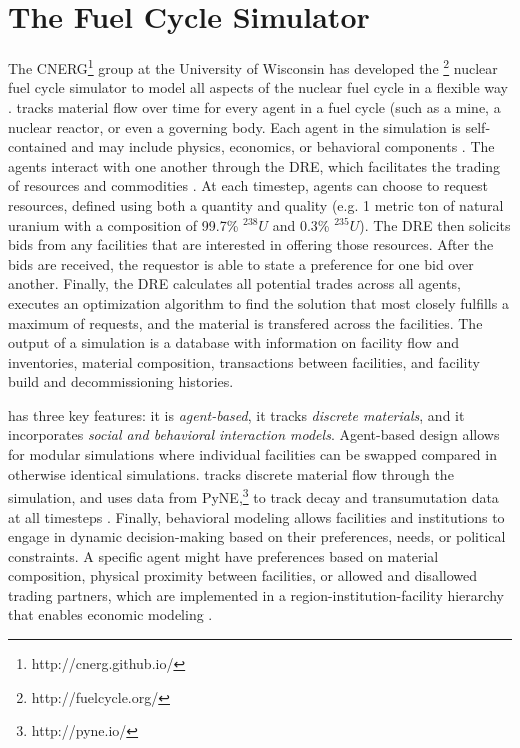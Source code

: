 \section{The \Cyclus Fuel Cycle Simulator}
\label{s_methods}

The \gls{CNERG}\footnote{http://cnerg.github.io/} group at the University of Wisconsin has developed the \Cyclus\footnote{http://fuelcycle.org/} nuclear fuel cycle simulator to model all aspects of the nuclear fuel cycle in a flexible way \cite{cyclus_v1_3}. \Cyclus tracks material flow over time for every agent in a fuel cycle (such as a mine, a nuclear reactor, or even a governing body.  Each agent in the simulation is self-contained and may include physics, economics, or behavioral components \cite{huff_open_2011,huff_fundamental_2016,gidden_agent-based_2013}.  The agents interact with one another through the \gls{DRE}, which facilitates the trading of resources and commodities \cite{gidden_agent-based_2014}.  At each timestep, agents can choose to request resources, defined using both a quantity and quality (e.g. 1 metric ton of natural uranium with a composition of 99.7\% $^{238}U$ and 0.3\% $^{235}U$).  The \gls{DRE} then solicits bids from any facilities that are interested in offering those resources.  After the bids are received, the requestor is able to state a preference for one bid over another. Finally, the \gls{DRE} calculates all potential trades across all agents, executes an optimization algorithm to find the solution that most closely fulfills a maximum of requests, and the material is transfered across the facilities.  The output of a \Cyclus simulation is a database with information on facility flow and inventories, material composition, transactions between facilities, and facility build and decommissioning histories.

\Cyclus has three key features: it is \textit{agent-based}, it tracks \textit{discrete materials}, and it incorporates \textit{social and behavioral interaction models}. Agent-based design allows for modular simulations where individual facilities can be swapped compared in otherwise identical simulations\cite{jennings_agent-based_2000, taylor2014agent}. \Cyclus tracks discrete material flow through the simulation, and uses data from PyNE,\footnote{http://pyne.io/} to track decay and transumutation data at all timesteps \cite{Scopatz2012b}. Finally, behavioral modeling allows facilities and institutions to engage in dynamic decision-making based on their preferences, needs, or political constraints.  A specific agent might have preferences based on material composition, physical proximity between facilities, or allowed and disallowed trading partners, which are implemented in a region-institution-facility hierarchy that enables economic modeling \cite{oliver_geniusv2:_2009}.

